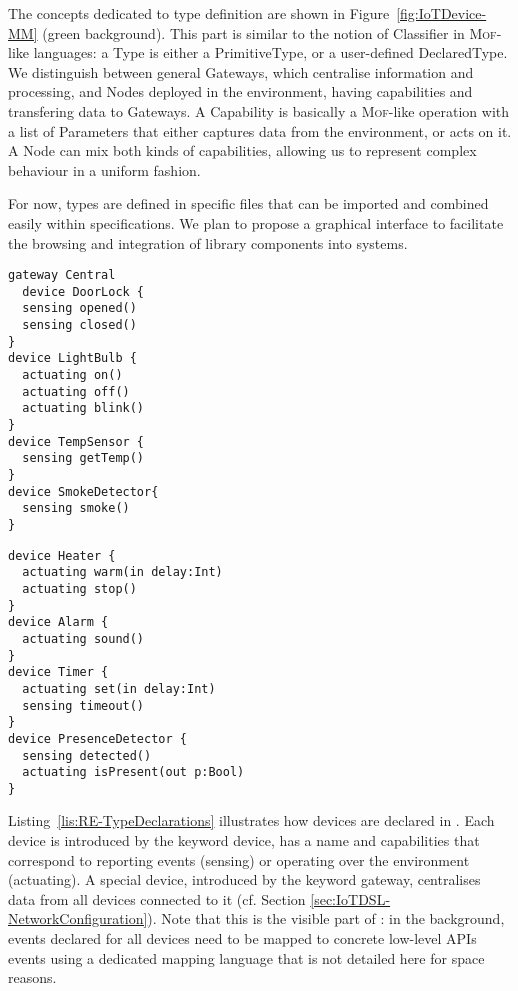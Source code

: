 The concepts dedicated to type definition are shown in Figure~\ref{fig:IoTDevice-MM} (green background). This part is similar to the notion of \textsf{Classifier} in \textsc{Mof}-like languages: a \textsf{Type} is either a \textsf{PrimitiveType}, or a user-defined \textsf{DeclaredType}. We distinguish between general \textsf{Gateway}s, which centralise information and processing, and \textsf{Node}s deployed in the environment, having capabilities and transfering data to \textsf{Gateway}s. A \textsf{Capability} is basically a \textsc{Mof}-like operation with a list of \textsf{Parameter}s that either captures data from the environment, or acts on it. A \textsf{Node} can mix both kinds of capabilities, allowing us to represent complex behaviour in a uniform fashion.

For now, types are defined in specific files that can be imported and combined easily within \IOT specifications. We plan to propose a graphical interface to facilitate the browsing and integration of library components into \IOT systems.

\begin{center}
  \begin{minipage}[t]{.38\linewidth}
    \begin{lstlisting}[language=iotdsl]	
gateway Central
  device DoorLock {
  sensing opened()
  sensing closed()
}
device LightBulb {
  actuating on()
  actuating off()
  actuating blink()
}	
device TempSensor {
  sensing getTemp()
}
device SmokeDetector{
  sensing smoke()
}
    \end{lstlisting}
  \end{minipage}\hfill
  \begin{minipage}[t]{.52\linewidth}
    \begin{lstlisting}[language=iotdsl, firstnumber=17]
device Heater {
  actuating warm(in delay:Int)
  actuating stop()
}
device Alarm {
  actuating sound()
}
device Timer {
  actuating set(in delay:Int)
  sensing timeout()
}
device PresenceDetector {
  sensing detected()
  actuating isPresent(out p:Bool)
}

    \end{lstlisting}
  \end{minipage}
  \label{lis:RE-TypeDeclarations}
\end{center}


Listing~\ref{lis:RE-TypeDeclarations} illustrates how devices are declared in \IOTDSL. Each device is introduced by the keyword \textsf{device}, has a name and capabilities that correspond to reporting events (\textsf{sensing}) or operating over the environment (\textsf{actuating}). A special device, introduced by the keyword \textsf{gateway}, centralises data from all devices connected to it (cf. Section \ref{sec:IoTDSL-NetworkConfiguration}). Note that this is the visible part of \IOTDSL: in the background, events declared for all devices need to be mapped to concrete low-level APIs events using a dedicated mapping language that is not detailed here for space reasons.



